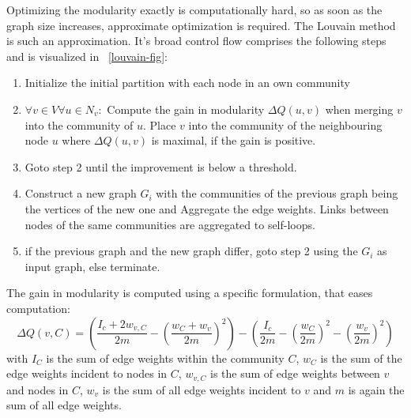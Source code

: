                 Optimizing the modularity exactly is computationally hard, so as soon as the graph size increases, approximate optimization is required.
                The Louvain method is such an approximation.
                It's broad control flow comprises the following steps and is visualized in ~\ref{louvain-fig}:
                \begin{enumerate}
                \item Initialize the initial partition with each node in an own community
                \item $\forall v \in V \forall u \in N_v:$ Compute the gain in modularity $\Delta Q(u,v)$ when merging $v$ into the community of $u$. Place $v$ into the community of the neighbouring node $u$ where $\Delta Q(u,v)$ is maximal, if the gain is positive.
                \item Goto step 2 until the improvement is below a threshold.
                \item Construct a new graph $G_i$ with the communities of the previous graph being the vertices of the new one and Aggregate the edge weights. Links between nodes of the same communities are aggregated to self-loops.
                \item if the previous graph and the new graph differ, goto step 2 using the $G_i$ as input graph, else terminate.
                \end{enumerate}
                The gain in modularity is computed using a specific formulation, that eases computation:
                \[ 
                  \Delta Q(v, C) = \left( \frac{I_c + 2w_{v, C}}{2m} - \left( \frac{w_C + w_v}{2m} \right)^2 \right) - \left( \frac{I_c}{2m} - \left( \frac{w_C}{2m} \right)^2 - \left( \frac{w_v}{2m} \right)^2 \right)  
                \]
                with $I_C$ is the sum of edge weights within the community $C$, $w_C$ is the sum of the edge weights incident to nodes in $C$, $w_{v, C}$ is the sum of edge weights between $v$ and nodes in $C$, $w_v$ is the sum of all edge weights incident to $v$ and $m$ is again the sum of all edge weights.
                
